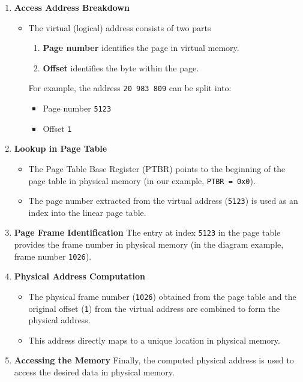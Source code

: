 \begin{enumerate}
    \item \textbf{Access Address Breakdown}
    \begin{itemize}
      \item[] The virtual (logical) address consists of two parts
        \begin{enumerate}
            \item \textbf{Page number} identifies the page in virtual memory.
            \item \textbf{Offset} identifies the byte within the page.
        \end{enumerate}
        For example, the address \texttt{20 983 809} can be split into:
        \begin{itemize}
            \item Page number \texttt{5123}
            \item Offset \texttt{1}
        \end{itemize}
    \end{itemize}

    \item \textbf{Lookup in Page Table}
    \begin{itemize}
        \item The Page Table Base Register (PTBR) points to the beginning of the page table in physical memory (in our example, \texttt{PTBR = 0x0}).
        \item The page number extracted from the virtual address (\texttt{5123}) is used as an index into the linear page table.
    \end{itemize}

    \item \textbf{Page Frame Identification} The entry at index \texttt{5123} in the page table provides the frame number in physical memory (in the diagram example, frame number \texttt{1026}).


    \item \textbf{Physical Address Computation}
    \begin{itemize}
        \item The physical frame number (\texttt{1026}) obtained from the page table and the original offset (\texttt{1}) from the virtual address are combined to form the physical address.
        \item This address directly maps to a unique location in physical memory.
    \end{itemize}

    \item \textbf{Accessing the Memory} Finally, the computed physical address is used to access the desired data in physical memory.
\end{enumerate}

